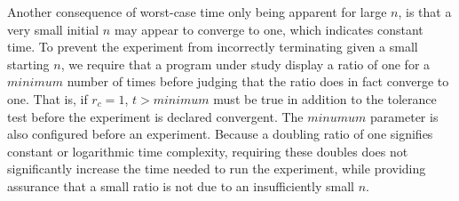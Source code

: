   Another consequence of worst-case time only being apparent for large
  $n$, is that a very small initial $n$ may appear to converge to one,
  which indicates constant time. To prevent the
  experiment from incorrectly terminating given a small starting $n$, we
  require that a program under study display a ratio of one for a
  $\mathit{minimum}$ number of times before judging that the ratio does in fact converge to one.
  That is, if $r_c = 1$, $t > \mathit{minimum}$ must be true in addition
  to the tolerance test before the experiment is declared convergent.
  The $\mathit{minumum}$ parameter is also configured before an
  experiment.
  Because a doubling ratio of one signifies constant or logarithmic
  time complexity, requiring these doubles does not significantly increase the time needed
  to run the experiment, while providing assurance that a small ratio is not due
  to an insufficiently small $n$.
